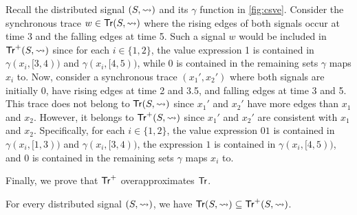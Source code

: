 \begin{example} \label{ex:overapx}
	Recall the distributed signal \((S, {\rightsquigarrow})\) and its \(\gamma\) function in \cref{fig:csve}.
	Consider the synchronous trace \(w \in \mathsf{Tr}(S, {\rightsquigarrow})\) where the rising edges of both signals occur at time 3 and the falling edges at time 5.
	Such a signal \( w \) would be included in \(\mathsf{Tr}^+(S,{\rightsquigarrow})\) since for each \(i \in \{1,2\}\), the value expression 1 is contained in \(\gamma(x_i, [3,4))\) and \(\gamma(x_i, [4,5))\), while 0 is contained in the remaining sets \(\gamma\) maps \(x_i\) to.
	Now, consider a synchronous trace \((x_1', x_2')\) where both signals are initially 0, have rising edges at time 2 and 3.5, and falling edges at time 3 and 5.
	This trace does not belong to \(\mathsf{Tr}(S, {\rightsquigarrow})\) since \(x_1'\) and \(x_2'\) have more edges than \(x_1\) and \(x_2\).
	However, it belongs to \(\mathsf{Tr}^+(S,{\rightsquigarrow})\) since \(x_1'\) and \(x_2'\) are consistent with \(x_1\) and \(x_2\).
	Specifically, for each \(i \in \{1,2\}\), the value expression \(01\) is contained in \(\gamma(x_i, [1,3))\) and \(\gamma(x_i, [3,4))\), the expression \(1\) is contained in \(\gamma(x_i, [4,5))\), and 0 is contained in the remaining sets \(\gamma\) maps \(x_i\) to.
\end{example}

Finally, we prove that $\mathsf{Tr}^+$ overapproximates $\mathsf{Tr}$.

\begin{lemma} \label{cl:trsound}
	For every distributed signal $(S,{\rightsquigarrow})$, we have $\mathsf{Tr}(S,{\rightsquigarrow}) \subseteq \mathsf{Tr}^+(S,{\rightsquigarrow})$.
\end{lemma}

